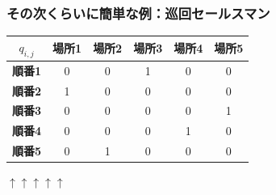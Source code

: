 \begin{frame}
  \frametitle{その次くらいに簡単な例：巡回セールスマン}

  \begin{table}
    \centering
    \begin{tabular}{c|c c c c c}
        \textbf{$q_{i,j}$} & \textbf{場所1} & \textbf{場所2} & \textbf{場所3} & \textbf{場所4} & \textbf{場所5} \\
        \hline
        \textbf{順番1} &{\cellcolor{blue!50}} 0 & 0 &{\cellcolor{blue!50}} \color{orange}1 & 0 &{\cellcolor{blue!50}} 0  \\
        \textbf{順番2} &{\cellcolor{blue!50}}\color{orange} 1 & 0 &{\cellcolor{blue!50}} 0 & 0 &{\cellcolor{blue!50}} 0  \\
        \textbf{順番3} &{\cellcolor{blue!50}} 0 & 0 &{\cellcolor{blue!50}} 0 & 0 &{\cellcolor{blue!50}} \color{orange}1  \\
        \textbf{順番4} &{\cellcolor{blue!50}} 0 & 0 &{\cellcolor{blue!50}} 0 & \color{orange}1 &{\cellcolor{blue!50}} 0  \\
        \textbf{順番5} &{\cellcolor{blue!50}} 0 & \color{orange}1 &{\cellcolor{blue!50}} 0 & 0 &{\cellcolor{blue!50}} 0  \\
    \end{tabular}
  \end{table}
  \hspace{4.65cm}$\uparrow$\hspace{1.3cm}$\uparrow$\hspace{1.3cm}$\uparrow$\hspace{1.3cm}$\uparrow$\hspace{1.3cm}$\uparrow$\\
\end{frame}

